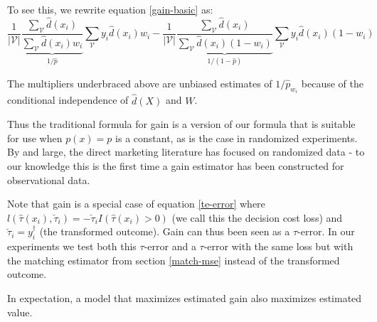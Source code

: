 To see this, we rewrite equation \ref{gain-basic} as:
\[
	 \dfrac{1}{|\mathcal V |} \underbrace{ \frac{ \sum_{\mathcal{V}} \hat d(x_i)}{\sum_{\mathcal{V}}  \hat d(x_i) w_i} }_{1/\hat p}
		  	\sum_{\mathcal{V}} y_i  \hat d(x_i) w_i - 
		\dfrac{1}{|\mathcal V |}  \underbrace{ \frac{ \sum_{\mathcal{V}} \hat d(x_i)}{\sum_{\mathcal{V}}  \hat d(x_i)  (1-w_i)} }_{1/ (1-\hat p)}
		  	\sum_{\mathcal{V}} y_i  \hat d(x_i) (1-w_i) 
\]

The multipliers underbraced above are unbiased estimates of $1/\hat p_{w_i}$ because of the conditional independence of $\hat d(X)$ and $W$. 

Thus the traditional formula for gain is a version of our formula that is suitable for use when $p(x) = p$ is a constant, as is the case in randomized experiments. By and large, the direct marketing literature has focused on randomized data - to our knowledge this is the first time a gain estimator has been constructed for observational data. 

Note that gain is a special case of equation \ref{te-error} where $l(\hat \tau (x_i), \check \tau_i) = -\check \tau_i  I(\hat \tau (x_i) > 0)$ (we call this the decision cost loss) and $\check\tau_i = y_i^{\dagger}$ (the transformed outcome). Gain can thus been seen as a $\tau$-error. In our experiments we test both this $\tau$-error and  a $\tau$-error with the same loss but with the matching estimator from section \ref{match-mse} instead of the transformed outcome.

\begin{theorem}
\label{gain-value}
In expectation, a model that maximizes estimated gain also maximizes estimated value.
\end{theorem}

